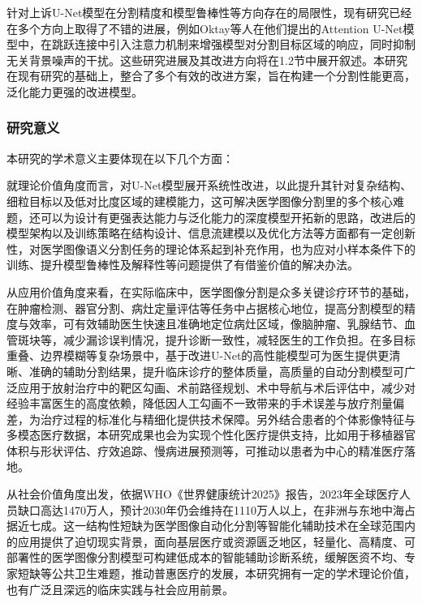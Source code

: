 针对上诉U-Net模型在分割精度和模型鲁棒性等方向存在的局限性，现有研究已经在多个方向上取得了不错的进展\cite{krithikaaliasanbudevi2022}，例如Oktay等人\cite{oktay2018}在他们提出的Attention U-Net模型中，在跳跃连接中引入注意力机制来增强模型对分割目标区域的响应，同时抑制无关背景噪声的干扰。这些研究进展及其改进方向将在1.2节中展开叙述。本研究在现有研究的基础上，整合了多个有效的改进方案，旨在构建一个分割性能更高，泛化能力更强的改进模型。

\subsubsection{研究意义}

本研究的学术意义主要体现在以下几个方面：

就理论价值角度而言，对U-Net模型展开系统性改进，以此提升其针对复杂结构、细粒目标以及低对比度区域的建模能力，这可解决医学图像分割里的多个核心难题，还可以为设计有更强表达能力与泛化能力的深度模型开拓新的思路，改进后的模型架构以及训练策略在结构设计、信息流建模以及优化方法等方面都有一定创新性，对医学图像语义分割任务的理论体系起到补充作用，也为应对小样本条件下的训练、提升模型鲁棒性及解释性等问题提供了有借鉴价值的解决办法。

从应用价值角度来看，在实际临床中，医学图像分割是众多关键诊疗环节的基础，在肿瘤检测、器官分割、病灶定量评估等任务中占据核心地位，提高分割模型的精度与效率，可有效辅助医生快速且准确地定位病灶区域，像脑肿瘤、乳腺结节、血管斑块等，减少漏诊误判情况，提升诊断一致性，减轻医生的工作负担。在多目标重叠、边界模糊等复杂场景中，基于改进U-Net的高性能模型可为医生提供更清晰、准确的辅助分割结果，提升临床诊疗的整体质量，高质量的自动分割模型可广泛应用于放射治疗中的靶区勾画、术前路径规划、术中导航与术后评估中，减少对经验丰富医生的高度依赖，降低因人工勾画不一致带来的手术误差与放疗剂量偏差，为治疗过程的标准化与精细化提供技术保障。另外结合患者的个体影像特征与多模态医疗数据，本研究成果也会为实现个性化医疗提供支持，比如用于移植器官体积与形状评估、疗效追踪、慢病进展预测等，可推动以患者为中心的精准医疗落地。

从社会价值角度出发，依据WHO《世界健康统计2025》报告\cite{who2021stats}，2023年全球医疗人员缺口高达1470万人，预计2030年仍会维持在1110万人以上，在非洲与东地中海占据近七成。这一结构性短缺为医学图像自动化分割等智能化辅助技术在全球范围内的应用提供了迫切现实背景，面向基层医疗或资源匮乏地区，轻量化、高精度、可部署性的医学图像分割模型可构建低成本的智能辅助诊断系统，缓解医资不均、专家短缺等公共卫生难题，推动普惠医疗的发展，本研究拥有一定的学术理论价值，也有广泛且深远的临床实践与社会应用前景。

